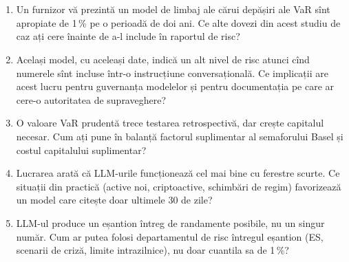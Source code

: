 \section{}
\begin{enumerate}
\item {}%
{Un furnizor vă prezintă un model de limbaj ale cărui depășiri ale VaR sînt apropiate de 1\,\% pe o perioadă de doi ani. Ce alte dovezi din acest studiu de caz ați cere înainte de a-l include în raportul de risc?}
\item {}%
{Același model, cu aceleași date, indică un alt nivel de risc atunci cînd numerele sînt incluse într-o instrucțiune conversațională. Ce implicații are acest lucru pentru guvernanța modelelor și pentru documentația pe care ar cere-o autoritatea de supraveghere?}
\item {}%
{O valoare VaR prudentă trece testarea retrospectivă, dar crește capitalul necesar. Cum ați pune în balanță factorul suplimentar al semaforului Basel și costul capitalului suplimentar?}
\item {}%
{Lucrarea arată că LLM-urile funcționează cel mai bine cu ferestre scurte. Ce situații din practică (active noi, criptoactive, schimbări de regim) favorizează un model care citește doar ultimele 30 de zile?}
\item {}%
{LLM-ul produce un eșantion întreg de randamente posibile, nu un singur număr. Cum ar putea folosi departamentul de risc întregul eșantion (ES, scenarii de criză, limite intrazilnice), nu doar cuantila sa de 1\,\%?}
\end{enumerate}

